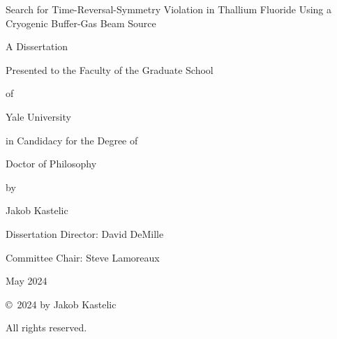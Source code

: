 \begin{center}
  \begin{minipage}{.8\textwidth}
      \centering
      \thispagestyle{empty}

      \vspace{3cm}

      {\large Search for Time-Reversal-Symmetry Violation in Thallium Fluoride
      Using a Cryogenic Buffer-Gas Beam Source}

      \vspace{3cm}

      {\large
      A Dissertation

        \vspace{2ex}

      Presented to the Faculty of the Graduate School

        \vspace{2ex}

      of 

        \vspace{2ex}

      Yale University

        \vspace{2ex}

      in Candidacy for the Degree of

        \vspace{2ex}

      Doctor of Philosophy

      \vspace{3.5cm}

      by

        \vspace{2ex}

      Jakob Kastelic

      \vspace{1cm}

      Dissertation Director: David DeMille

      \vspace{2ex}

      Committee Chair: Steve Lamoreaux

      \vspace{1cm}

      May 2024}
  \end{minipage}
\end{center}


\newpage

\mbox{}

\vspace{2in}
\thispagestyle{empty}

\copyright\ 2024{} by Jakob Kastelic

All rights reserved.

\setcounter{page}{2}
\clearpage



\tableofcontents
\clearpage
\listoffigures
\clearpage
\listoftables
